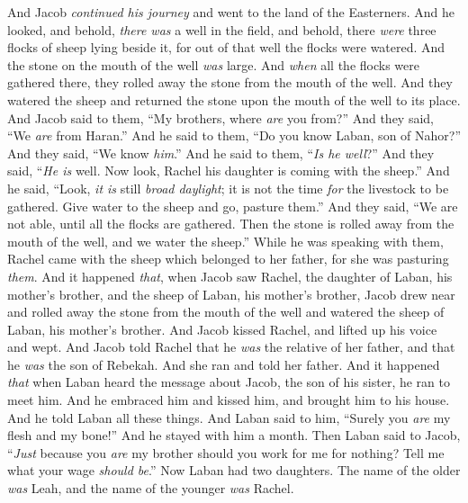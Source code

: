 \begin{biblechapter} %
 And Jacob \textit{continued his journey} and went to the land of the Easterners.
\verse And he looked, and behold, \textit{there was} a well in the field, and behold, there \textit{were} three flocks of sheep lying beside it, for out of that well the flocks were watered. And the stone on the mouth of the well \textit{was} large.
\verse And \textit{when} all the flocks were gathered there, they rolled away the stone from the mouth of the well. And they watered the sheep and returned the stone upon the mouth of the well to its place.
\verse And Jacob said to them, “My brothers, where \textit{are} you from?” And they said, “We \textit{are} from Haran.”
\verse And he said to them, “Do you know Laban, son of Nahor?” And they said, “We know \textit{him}.”
\verse And he said to them, “\textit{Is he well}?” And they said, “\textit{He is} well. Now look, Rachel his daughter is coming with the sheep.”
\verse And he said, “Look, \textit{it is} still \textit{broad daylight}; it is not the time \textit{for} the livestock to be gathered. Give water to the sheep and go, pasture them.”
\verse And they said, “We are not able, until all the flocks are gathered. Then the stone is rolled away from the mouth of the well, and we water the sheep.”
\verse While he was speaking with them, Rachel came with the sheep which belonged to her father, for she was pasturing \textit{them}.
\verse And it happened \textit{that}, when Jacob saw Rachel, the daughter of Laban, his mother’s brother, and the sheep of Laban, his mother’s brother, Jacob drew near and rolled away the stone from the mouth of the well and watered the sheep of Laban, his mother’s brother.
\verse And Jacob kissed Rachel, and lifted up his voice and wept.
\verse And Jacob told Rachel that he \textit{was} the relative of her father, and that he \textit{was} the son of Rebekah. And she ran and told her father.
\verse And it happened \textit{that} when Laban heard the message about Jacob, the son of his sister, he ran to meet him. And he embraced him and kissed him, and brought him to his house. And he told Laban all these things.
\verse And Laban said to him, “Surely you \textit{are} my flesh and my bone!” And he stayed with him a month.
 Then Laban said to Jacob, “\textit{Just} because you \textit{are} my brother should you work for me for nothing? Tell me what your wage \textit{should be}.”
\verse Now Laban had two daughters. The name of the older \textit{was} Leah, and the name of the younger \textit{was} Rachel.

\end{biblechapter}
